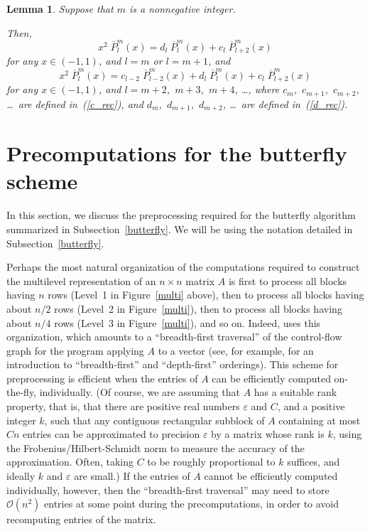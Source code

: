 \documentclass[final,3p,times]{elsarticle}
\def\epsilon{\varepsilon}
\def\bigoh{\mathcal{O}}
\newtheorem{lemma1}[theorem]{Lemma}
\newenvironment{lemma}{\begin{lemma1}}{\end{lemma1}}
\begin{document}
\begin{lemma}
\label{rec_relation}
Suppose that $m$ is a nonnegative integer.

Then,
\begin{equation}
\label{recurrence0}
x^2 \; \overline{P}^m_l(x)
= d_l \; \overline{P}^m_l(x)
+ c_l \; \overline{P}^m_{l+2}(x)
\end{equation}
for any $x \in (-1,1)$, and $l = m$ or $l = m+1$, and
\begin{equation}
\label{recurrence}
x^2 \; \overline{P}^m_l(x)
= c_{l-2} \; \overline{P}^m_{l-2}(x)
+ d_l \; \overline{P}^m_l(x)
+ c_l \; \overline{P}^m_{l+2}(x)
\end{equation}
for any $x \in (-1,1)$, and $l = m+2$,~$m+3$,~$m+4$, \dots,
where $c_m$,~$c_{m+1}$,~$c_{m+2}$, \dots\ are defined in~(\ref{c_rec}),
and $d_m$,~$d_{m+1}$,~$d_{m+2}$, \dots\ are defined in~(\ref{d_rec}).
\end{lemma}



\section{Precomputations for the butterfly scheme}
\label{precomps}

In this section, we discuss the preprocessing required
for the butterfly algorithm summarized in Subsection~\ref{butterfly}.
We will be using the notation detailed in Subsection~\ref{butterfly}.

Perhaps the most natural organization of the computations required
to construct the multilevel representation of an $n \times n$ matrix $A$
is first to process all blocks having $n$ rows
(Level~1 in Figure~\ref{multi} above),
then to process all blocks having about $n/2$ rows
(Level~2 in Figure~\ref{multi}),
then to process all blocks having about $n/4$ rows
(Level~3 in Figure~\ref{multi}), and so on.
Indeed, \cite{oneil-woolfe-rokhlin} uses this organization,
which amounts to a ``breadth-first traversal''
of the control-flow graph for the program applying $A$ to a vector
(see, for example, \cite{aho-hopcroft-ullman}
for an introduction to ``breadth-first'' and ``depth-first'' orderings).
This scheme for preprocessing is efficient when the entries of $A$
can be efficiently computed on-the-fly, individually.
(Of course, we are assuming that $A$ has a suitable rank property, that is,
that there are positive real numbers $\epsilon$ and $C$,
and a positive integer $k$, such that
any contiguous rectangular subblock of $A$ containing at most $Cn$ entries
can be approximated to precision $\epsilon$ by a matrix whose rank is $k$,
using the Frobenius/Hilbert-Schmidt norm to measure the accuracy
of the approximation. Often, taking $C$ to be roughly proportional
to $k$ suffices, and ideally $k$ and $\epsilon$ are small.)
If the entries of $A$ cannot be efficiently computed individually,
however, then the ``breadth-first traversal'' may need
to store $\bigoh(n^2)$ entries at some point during the precomputations,
in order to avoid recomputing entries of the matrix.
\end{document}
